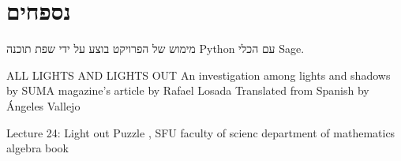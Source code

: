 \documentclass[12pt,twoside]{article}
\begin{document}
\newpage
\section{נספחים}
מימוש של הפרויקט בוצע על ידי 
שפת תוכנה 
{Python}
עם הכלי 
{Sage}.


\newpage
\begin{thebibliography}{99}
\begin{english}
 ALL LIGHTS AND LIGHTS OUT
An investigation among lights and shadows by
SUMA magazine’s article by Rafael Losada
Translated from Spanish by Ángeles Vallejo

 Lecture 24: Light out Puzzle , SFU faculty of scienc department of mathematics
 algebra book %
\end{english}
\end{thebibliography}
\end{document}
